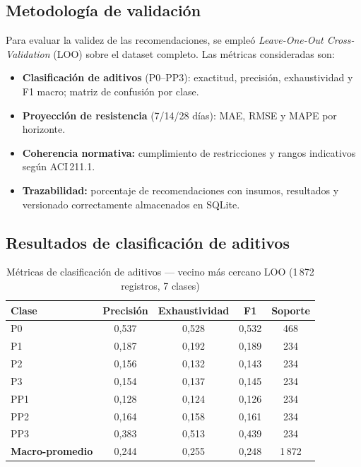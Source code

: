 \subsection{Metodología de validación}

Para evaluar la validez de las recomendaciones, se empleó \textit{Leave-One-Out Cross-Validation} (LOO) sobre el dataset completo. Las métricas consideradas son:
\begin{itemize}
  \item \textbf{Clasificación de aditivos} (P0--PP3): exactitud, precisión, exhaustividad y F1 macro; matriz de confusión por clase.
  \item \textbf{Proyección de resistencia} (7/14/28 días): MAE, RMSE y MAPE por horizonte.
  \item \textbf{Coherencia normativa:} cumplimiento de restricciones y rangos indicativos según ACI\,211.1.
  \item \textbf{Trazabilidad:} porcentaje de recomendaciones con insumos, resultados y versionado correctamente almacenados en SQLite.
\end{itemize}

\subsection{Resultados de clasificación de aditivos}

\begin{table}[H]
  \centering
  \caption{Métricas de clasificación de aditivos --- vecino más cercano LOO (1\,872 registros, 7 clases)}
  \begin{tabular}{lcccc}
    \hline
    Clase & Precisión & Exhaustividad & F1 & Soporte \\
    \hline
    P0  & 0{,}537 & 0{,}528 & 0{,}532 & 468 \\
    P1  & 0{,}187 & 0{,}192 & 0{,}189 & 234 \\
    P2  & 0{,}156 & 0{,}132 & 0{,}143 & 234 \\
    P3  & 0{,}154 & 0{,}137 & 0{,}145 & 234 \\
    PP1 & 0{,}128 & 0{,}124 & 0{,}126 & 234 \\
    PP2 & 0{,}164 & 0{,}158 & 0{,}161 & 234 \\
    PP3 & 0{,}383 & 0{,}513 & 0{,}439 & 234 \\
    \textbf{Macro-promedio} & 0{,}244 & 0{,}255 & 0{,}248 & 1\,872 \\
    \hline
  \end{tabular}
\end{table}

